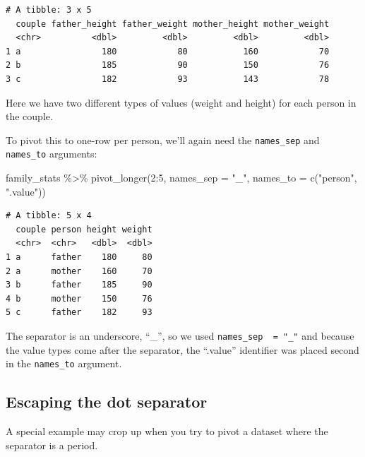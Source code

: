 \documentclass[
  letterpaper,
  DIV=11,
  numbers=noendperiod]{scrreprt}
\newenvironment{Shaded}{\begin{snugshade}}{\end{snugshade}}
\newcommand{\AttributeTok}[1]{\textcolor[rgb]{0.40,0.45,0.13}{#1}}
\newcommand{\DecValTok}[1]{\textcolor[rgb]{0.68,0.00,0.00}{#1}}
\newcommand{\FunctionTok}[1]{\textcolor[rgb]{0.28,0.35,0.67}{#1}}
\newcommand{\NormalTok}[1]{\textcolor[rgb]{0.00,0.23,0.31}{#1}}
\newcommand{\SpecialCharTok}[1]{\textcolor[rgb]{0.37,0.37,0.37}{#1}}
\newcommand{\StringTok}[1]{\textcolor[rgb]{0.13,0.47,0.30}{#1}}
\begin{document}
\begin{verbatim}
# A tibble: 3 x 5
  couple father_height father_weight mother_height mother_weight
  <chr>          <dbl>         <dbl>         <dbl>         <dbl>
1 a                180            80           160            70
2 b                185            90           150            76
3 c                182            93           143            78
\end{verbatim}

Here we have two different types of values (weight and height) for each
person in the couple.

To pivot this to one-row per person, we'll again need the
\texttt{names\_sep} and \texttt{names\_to} arguments:

\begin{Shaded}
\begin{Highlighting}[]
\NormalTok{family\_stats }\SpecialCharTok{\%\textgreater{}\%} 
  \FunctionTok{pivot\_longer}\NormalTok{(}\DecValTok{2}\SpecialCharTok{:}\DecValTok{5}\NormalTok{, }
               \AttributeTok{names\_sep  =} \StringTok{"\_"}\NormalTok{,}
               \AttributeTok{names\_to =} \FunctionTok{c}\NormalTok{(}\StringTok{"person"}\NormalTok{, }\StringTok{".value"}\NormalTok{))}
\end{Highlighting}
\end{Shaded}

\begin{verbatim}
# A tibble: 5 x 4
  couple person height weight
  <chr>  <chr>   <dbl>  <dbl>
1 a      father    180     80
2 a      mother    160     70
3 b      father    185     90
4 b      mother    150     76
5 c      father    182     93
\end{verbatim}

The separator is an underscore, ``\_'', so we used
\texttt{names\_sep\ \ =\ "\_"} and because the value types come after
the separator, the ``.value'' identifier was placed second in the
\texttt{names\_to} argument.

\hypertarget{escaping-the-dot-separator}{%
\subsection{Escaping the dot
separator}\label{escaping-the-dot-separator}}

A special example may crop up when you try to pivot a dataset where the
separator is a period.
\end{document}
